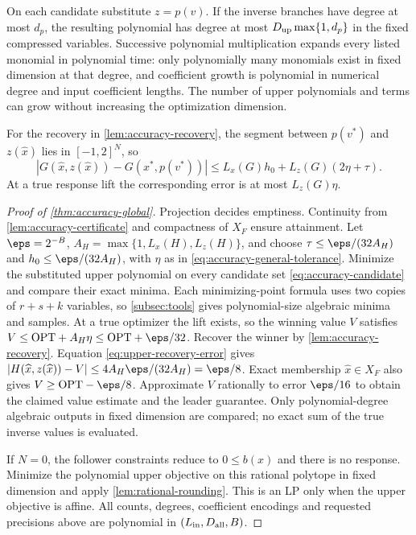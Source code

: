 On each candidate substitute $z=p(v)$. If the inverse branches have
degree at most $d_p$, the resulting polynomial has degree at most
$D_{\rm up}\max\{1,d_p\}$ in the fixed compressed variables.
Successive polynomial multiplication expands every listed monomial in
polynomial time: only polynomially many monomials exist in fixed
dimension at that degree, and coefficient growth is polynomial in
numerical degree and input coefficient lengths. The number of upper
polynomials and terms can grow without increasing the optimization
dimension.

For the recovery in \cref{lem:accuracy-recovery}, the segment between
$p(v^*)$ and $z(\widehat x)$ lies in $[-1,2]^N$, so
\begin{equation}\label{eq:upper-recovery-error}
 |G(\widehat x,z(\widehat x))-G(x^*,p(v^*))|
 \le L_x(G)h_0+L_z(G)(2\eta+\tau).
\end{equation}
At a true response lift the corresponding error is at most $L_z(G)\eta$.

\begin{proof}[Proof of \cref{thm:accuracy-global}]
Projection decides emptiness. Continuity from
\cref{lem:accuracy-certificate} and compactness of $X_F$ ensure
attainment. Let $\eps=2^{-B}$,
$A_H=\max\{1,L_x(H),L_z(H)\}$, and choose
$\tau\le\eps/(32A_H)$ and $h_0\le\eps/(32A_H)$, with
$\eta$ as in \eqref{eq:accuracy-general-tolerance}.
Minimize the substituted upper polynomial on every candidate set
\eqref{eq:accuracy-candidate} and compare their exact minima.
Each minimizing-point formula uses two copies of $r+s+k$ variables,
so \cref{subsec:tools} gives polynomial-size algebraic minima
and samples. At a true optimizer the lift exists, so the winning
value $V$ satisfies $V\le\mathrm{OPT}+A_H\eta\le\mathrm{OPT}+\eps/32$.
Recover the winner by \cref{lem:accuracy-recovery}.
Equation \eqref{eq:upper-recovery-error} gives
$|H(\widehat x,z(\widehat x))-V|\le4A_H\eps/(32A_H)=\eps/8$.
Exact membership $\widehat x\in X_F$ also gives
$V\ge\mathrm{OPT}-\eps/8$. Approximate $V$ rationally to error
$\eps/16$ to obtain the claimed value estimate and the leader guarantee.
Only polynomial-degree algebraic outputs in fixed dimension are compared;
no exact sum of the true inverse values is evaluated.

If $N=0$, the follower constraints reduce to $0\le b(x)$ and there
is no response. Minimize the polynomial upper objective on this rational
polytope in fixed dimension and apply \cref{lem:rational-rounding}.
This is an LP only when the upper objective is affine. All counts,
degrees, coefficient encodings and requested precisions above are
polynomial in $(L_{\rm in},D_{\rm all},B)$.
\end{proof}

